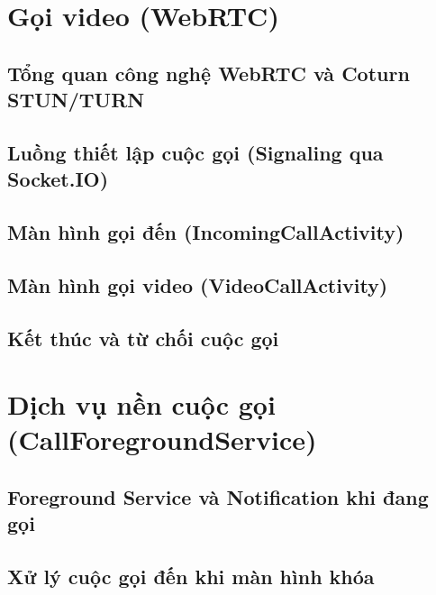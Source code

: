 \section{Gọi video (WebRTC)}

\subsection{Tổng quan công nghệ WebRTC và Coturn STUN/TURN}


\subsection{Luồng thiết lập cuộc gọi (Signaling qua Socket.IO)}


\subsection{Màn hình gọi đến (IncomingCallActivity)}


\subsection{Màn hình gọi video (VideoCallActivity)}


\subsection{Kết thúc và từ chối cuộc gọi}


\section{Dịch vụ nền cuộc gọi (CallForegroundService)}

\subsection{Foreground Service và Notification khi đang gọi}


\subsection{Xử lý cuộc gọi đến khi màn hình khóa}


